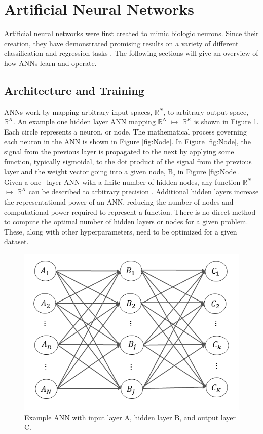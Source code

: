 \documentclass[tocnosub,noragright,centerchapter,12pt,fullpage]{uiucecethesis09}
\begin{document}
\section{Artificial Neural Networks}

Artificial neural networks were first created to mimic biologic neurons. Since their creation, they have demonstrated promising results on a variety of different classification and regression tasks \cite{Jeyanthia2015, Krizhevsky2012, Rababaah2015}. The following sections will give an overview of how ANNs learn and operate.


\subsection{Architecture and Training}

ANNs work by mapping arbitrary input spaces, $\mathbb{R}^N$, to arbitrary output space, $\mathbb{R}^K$. An example one hidden layer ANN mapping $\mathbb{R}^N$ $\mapsto$ $\mathbb{R}^K$ is shown in Figure \ref{fig:Network}. Each circle represents a neuron, or node. The mathematical process governing each neuron in the ANN is shown in Figure \ref{fig:Node}. In Figure \ref{fig:Node}, the signal from the previous layer is propagated to the next by applying some function, typically sigmoidal, to the dot product of the signal from the previous layer and the weight vector going into a given node, B$_{j}$ in Figure \ref{fig:Node}. Given a one$-$layer ANN with a finite number of hidden nodes, any function $\mathbb{R}^N$ $\mapsto$ $\mathbb{R}^K$ can be described to arbitrary precision \cite{hornik1991}. Additional hidden layers increase the representational power of an ANN, reducing the number of nodes and computational power required to represent a function. There is no direct method to compute the optimal number of hidden layers or nodes for a given problem. These, along with other hyperparameters, need to be optimized for a given dataset.

\begin{figure}
    \centering
    \includegraphics[width=0.5\linewidth]{images/Network}
    \caption{Example ANN with input layer A, hidden layer B, and output layer C.}
    \label{fig:Network}
\end{figure}
\end{document}
